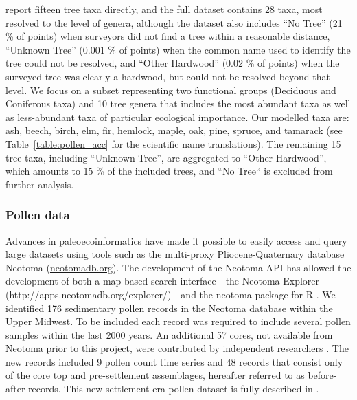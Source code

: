 \documentclass[12pt]{article}
\begin{document}
\citet{goring_witness} report fifteen tree taxa directly, and the full
dataset contains 28 taxa, most resolved to the level of genera,
although the dataset also includes ``No Tree'' (21 \% of points) when
surveyors did not find a tree within a reasonable distance, ``Unknown
Tree'' (0.001 \% of points) when the common name used to identify the
tree could not be resolved, and ``Other Hardwood'' (0.02 \% of points)
when the surveyed tree was clearly a hardwood, but could not be
resolved beyond that level. We focus on a subset representing two
functional groups (Deciduous and Coniferous taxa) and 10 tree genera
that includes the most abundant taxa as well as less-abundant taxa of
particular ecological importance. Our modelled taxa are: ash, beech,
birch, elm, fir, hemlock, maple, oak, pine, spruce, and tamarack (see
Table~\ref{table:pollen_acc} for the scientific name
translations). The remaining 15 tree taxa, including ``Unknown Tree'',
are aggregated to ``Other Hardwood'', which amounts to 15 \% of the
included trees, and ``No Tree`` is excluded from further analysis.



\subsubsection{Pollen data}

Advances in paleoecoinformatics \citep{brewer2012paleoecoinformatics,
  grimm2013encyclopedia} have made it possible to easily access and
query large datasets using tools such as the multi-proxy
Pliocene-Quaternary database Neotoma (\url{neotomadb.org}). The
development of the Neotoma API has allowed the development of both a
map-based search interface - the Neotoma Explorer
(http://apps.neotomadb.org/explorer/) - and the neotoma package for R
\citep{goring2015}. We identified 176 sedimentary pollen records in
the Neotoma database within the Upper Midwest. To be included each
record was required to include several pollen samples within the last
2000 years.  An additional 57 cores, not available from Neotoma prior
to this project, were contributed by independent researchers
\citep{kujawa2015}. The new records included 9 pollen count time
series and 48 records that consist only of the core top and
pre-settlement assemblages, hereafter referred to as before-after
records. This new settlement-era pollen dataset is fully described in
\citet{kujawa2015}.
\end{document}
